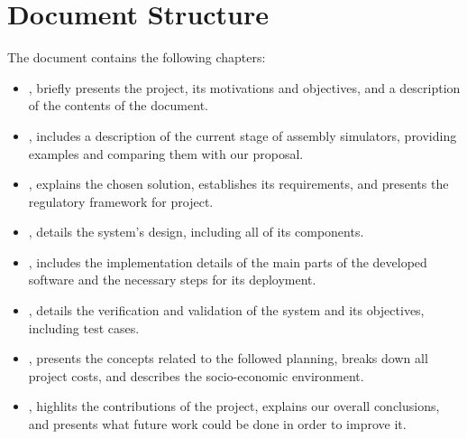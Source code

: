 \section{Document Structure}\label{sec:structure}
The document contains the following chapters:
\begin{itemize}
  \item {}, briefly presents the project, its motivations and objectives, and a description of the contents of the document.
  \item {}, includes a description of the current stage of \gls{assembly} simulators, providing examples and comparing them with our proposal.
  \item {}, explains the chosen solution, establishes its requirements, and presents the regulatory framework for project.
  \item {}, details the system's design, including all of its components.
  \item {}, includes the implementation details of the main parts of the developed software and the necessary steps for its deployment.
  \item {}, details the verification and validation of the system and its objectives, including test cases.
  \item {}, presents the concepts related to the followed planning, breaks down all project costs, and describes the socio-economic environment.
  \item {}, highlits the contributions of the project, explains our overall conclusions, and presents what future work could be done in order to improve it.
\end{itemize}